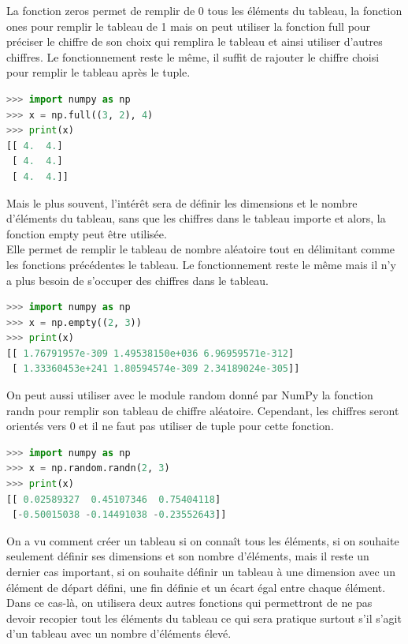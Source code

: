 \documentclass[a4paper, 12pt]{article}
\numberwithin{equation}{subsection}
\begin{document}
La fonction zeros permet de remplir de 0 tous les éléments du tableau, la fonction ones pour remplir le tableau de 1 mais on peut utiliser la fonction full pour préciser le chiffre de son choix qui remplira le tableau et ainsi utiliser d’autres chiffres. Le fonctionnement reste le même, il suffit de rajouter le chiffre choisi pour remplir le tableau après le tuple.
\begin{lstlisting}[language=Python]
>>> import numpy as np
>>> x = np.full((3, 2), 4)
>>> print(x)
[[ 4.  4.]
 [ 4.  4.]
 [ 4.  4.]]
\end{lstlisting}
Mais le plus souvent, l’intérêt sera de définir les dimensions et le nombre d’éléments du tableau, sans que les chiffres dans le tableau importe et alors, la fonction empty peut être utilisée. \\

Elle permet de remplir le tableau de nombre aléatoire tout en délimitant comme les fonctions précédentes le tableau. Le fonctionnement reste le même mais il n’y a plus besoin de s’occuper des chiffres dans le tableau.
\begin{lstlisting}[language=Python]
>>> import numpy as np
>>> x = np.empty((2, 3))
>>> print(x)
[[ 1.76791957e-309 1.49538150e+036 6.96959571e-312]
 [ 1.33360453e+241 1.80594574e-309 2.34189024e-305]]
\end{lstlisting}
On peut aussi utiliser avec le module random donné par NumPy la fonction randn pour remplir son tableau de chiffre aléatoire. Cependant, les chiffres seront orientés vers 0 et il ne faut pas utiliser de tuple pour cette fonction.
\begin{lstlisting}[language=Python]
>>> import numpy as np
>>> x = np.random.randn(2, 3)
>>> print(x)
[[ 0.02589327  0.45107346  0.75404118]
 [-0.50015038 -0.14491038 -0.23552643]]
\end{lstlisting}
On a vu comment créer un tableau si on connaît tous les éléments, si on souhaite seulement définir ses dimensions et son nombre d’éléments, mais il reste un dernier cas important, si on souhaite définir un tableau à une dimension avec un élément de départ défini, une fin définie et un écart égal entre chaque élément. \\

Dans ce cas-là, on utilisera deux autres fonctions qui permettront de ne pas devoir recopier tout les éléments du tableau ce qui sera pratique surtout s’il s’agit d’un tableau avec un nombre d’éléments élevé. \\
\end{document}

